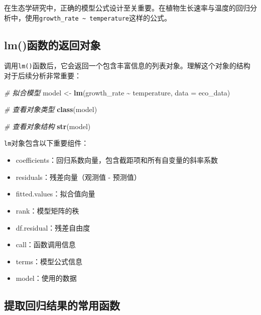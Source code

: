 \documentclass[
  twoside,12pt,fontset=none]{ctexbook}
\newenvironment{Shaded}{\begin{snugshade}}{\end{snugshade}}
\newcommand{\AttributeTok}[1]{\textcolor[rgb]{0.13,0.29,0.53}{#1}}
\newcommand{\CommentTok}[1]{\textcolor[rgb]{0.56,0.35,0.01}{\textit{#1}}}
\newcommand{\FunctionTok}[1]{\textcolor[rgb]{0.13,0.29,0.53}{\textbf{#1}}}
\newcommand{\NormalTok}[1]{#1}
\newcommand{\OtherTok}[1]{\textcolor[rgb]{0.56,0.35,0.01}{#1}}
\newcommand{\SpecialCharTok}[1]{\textcolor[rgb]{0.81,0.36,0.00}{\textbf{#1}}}
\providecommand{\tightlist}{%
  \setlength{\itemsep}{0pt}\setlength{\parskip}{0pt}}
\begin{document}
在生态学研究中，正确的模型公式设计至关重要。在植物生长速率与温度的回归分析中，使用\texttt{growth\_rate\ \textasciitilde{}\ temperature}这样的公式。

\hypertarget{lmux51fdux6570ux7684ux8fd4ux56deux5bf9ux8c61}{%
\subsection{lm()函数的返回对象}\label{lmux51fdux6570ux7684ux8fd4ux56deux5bf9ux8c61}}

调用\texttt{lm()}函数后，它会返回一个包含丰富信息的列表对象。理解这个对象的结构对于后续分析非常重要：

\begin{Shaded}
\begin{Highlighting}[]
\CommentTok{\# 拟合模型}
\NormalTok{model }\OtherTok{\textless{}{-}} \FunctionTok{lm}\NormalTok{(growth\_rate }\SpecialCharTok{\textasciitilde{}}\NormalTok{ temperature, }\AttributeTok{data =}\NormalTok{ eco\_data)}

\CommentTok{\# 查看对象类型}
\FunctionTok{class}\NormalTok{(model)}

\CommentTok{\# 查看对象结构}
\FunctionTok{str}\NormalTok{(model)}
\end{Highlighting}
\end{Shaded}

\texttt{lm}对象包含以下重要组件：

\begin{itemize}
\tightlist
\item
  coefficients：回归系数向量，包含截距项和所有自变量的斜率系数
\item
  residuals：残差向量（观测值 - 预测值）
\item
  fitted.values：拟合值向量
\item
  rank：模型矩阵的秩
\item
  df.residual：残差自由度
\item
  call：函数调用信息
\item
  terms：模型公式信息
\item
  model：使用的数据
\end{itemize}

\hypertarget{ux63d0ux53d6ux56deux5f52ux7ed3ux679cux7684ux5e38ux7528ux51fdux6570}{%
\subsection{提取回归结果的常用函数}\label{ux63d0ux53d6ux56deux5f52ux7ed3ux679cux7684ux5e38ux7528ux51fdux6570}}
\end{document}
